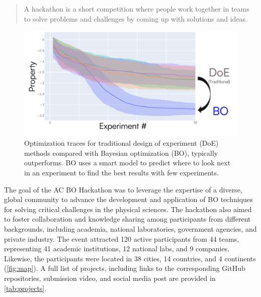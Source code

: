 \documentclass[superscriptaddress, nofootinbib,  amsmath, amssymb, twocolumn]{revtex4-2}
\begin{document}
\begin{quote}
A hackathon is a short competition where people work together in teams to solve problems and challenges by coming up with solutions and ideas.
\end{quote}

\begin{figure}
    \centering
    \includegraphics[width=1\linewidth]{latex/figures/intro-bo.png}
    \caption{Optimization traces for traditional design of experiment (DoE) methods compared with Bayesian optimization (BO), typically outperforms. BO uses a smart model to predict where to look next in an experiment to find the best results with few experiments.}
    \label{fig:intro-bo}
\end{figure}


The goal of the AC BO Hackathon was to leverage the expertise of a diverse, global community to advance the development and application of BO techniques for solving critical challenges in the physical sciences. The hackathon also aimed to foster collaboration and knowledge sharing among participants from different backgrounds, including academia, national laboratories, government agencies, and private industry. The event attracted 120 active participants from 44 teams, representing 41 academic institutions, 12 national labs, and 9 companies. Likewise, the participants were located in 38 cities, 14 countries, and 4 continents (\cref{fig:map}). A full list of projects, including links to the corresponding GitHub repositories, submission video, and social media post are provided in \cref{tab:projects}.
\end{document}
